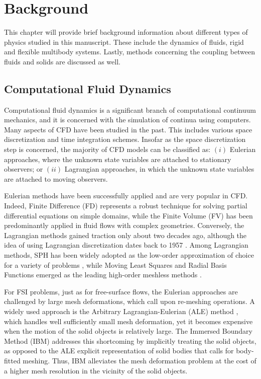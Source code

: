 
\chapter{Background}
\label{chap:background}
This chapter will provide brief background information about different types of physics studied in this manuscript. These include the dynamics of fluids, rigid and flexible multibody systems. Lastly, methods concerning the coupling between fluids and solids are discussed as well.

\section{Computational Fluid Dynamics}
Computational fluid dynamics is a significant branch of computational continuum mechanics, and it is concerned with the simulation of continua using computers. Many aspects of CFD have been studied in the past. This includes various space discretization and time integration schemes. Insofar as the space discretization step is concerned, the majority of CFD models can be classified as: $(i)$ Eulerian approaches, where the unknown state variables are attached to stationary observers; or $(ii)$ Lagrangian approaches, in which the unknown state variables are attached to moving observers.

Eulerian methods have been successfully applied and are very popular in CFD. Indeed, Finite Difference (FD) represents a robust technique for solving partial differential equations on simple domains, while the Finite Volume (FV) has been predominantly applied in fluid flows with complex geometries. Conversely, the Lagrangian methods gained traction only about two decades ago, although the idea of using Lagrangian discretization dates back to 1957 \cite{PIC}. Among Lagrangian methods, SPH  \cite{Lucy1977,Gingold1977} has been widely adopted as the low-order approximation of choice for a variety of problems \cite{Monaghan2005a}, while Moving Least Squares and Radial Basis Functions emerged as the leading high-order meshless methods \cite{trask2016compact,hu2019spatially,trask2018compatible,kansa1990scattered}. 

For FSI problems, just as for free-surface flows, the Eulerian approaches are challenged by large mesh deformations, which call upon re-meshing operations. A widely used approach is the Arbitrary Lagrangian-Eulerian (ALE) method \cite{ALE1974}, which handles well sufficiently small mesh deformation, yet it becomes expensive when the motion of the solid objects is relatively large. The Immersed Boundary Method (IBM) \cite{Peskin1977} addresses this shortcoming by implicitly treating the solid objects, as opposed to the ALE explicit representation of solid bodies that calls for body-fitted meshing. Thus, IBM alleviates the mesh deformation problem at the cost of a higher mesh resolution in the vicinity of the solid objects. 

